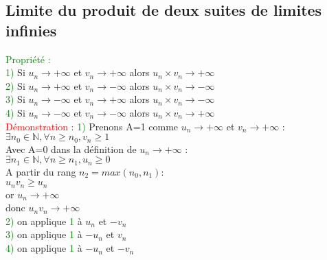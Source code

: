 \documentclass{article}
\begin{document}
	\subsection{Limite du produit de deux suites de limites infinies}
	\textcolor{green}{Propriété :} \\ 
	\textcolor{green}{1)} Si $u_n \rightarrow + \infty$ et $v_n \rightarrow + \infty$ alors $u_n \times v_n \rightarrow + \infty$\\
	\textcolor{green}{2)} Si $u_n \rightarrow + \infty$ et $v_n \rightarrow - \infty$ alors $u_n \times v_n \rightarrow - \infty$ \\
	\textcolor{green}{3)} Si $u_n \rightarrow - \infty$ et $v_n \rightarrow + \infty$ alors $u_n \times v_n \rightarrow - \infty$ \\ 
	\textcolor{green}{4)} Si $u_n \rightarrow - \infty$ et $v_n \rightarrow - \infty$ alors $u_n \times v_n \rightarrow + \infty$ \\ 
	\textcolor{red}{Démonstration :} \textcolor{green}{1)} Prenons A=1 comme $u_n \rightarrow + \infty$ et $v_n \rightarrow + \infty$ : \\ 
	$\exists n_0 \in \mathbb{N}, \forall n \geq n_0, v_n \geq 1 $ \\ 
	Avec A=0 dans la définition de $u_n \rightarrow + \infty $ : \\ 
	$\exists n_1 \in \mathbb{N}, \forall n \geq n_1, u_n \geq 0$ \\ 
	A partir du rang $n_2=max(n_0,n_1) :$ \\ 
	$u_n v_n \geq u_n$ \\ 
	or $u_n \rightarrow + \infty$ \\ 
	donc $u_n v_n \rightarrow + \infty$ \\ 
	\textcolor{green}{2)} on applique \textcolor{green}{1} à $u_n$ et $-v_n$ \\
	\textcolor{green}{3)} on applique \textcolor{green}{1} à $-u_n$ et $v_n$ \\ 
	\textcolor{green}{4)} on applique \textcolor{green}{1} à $-u_n$ et $-v_n$ \\ 
	
	
\end{document}
